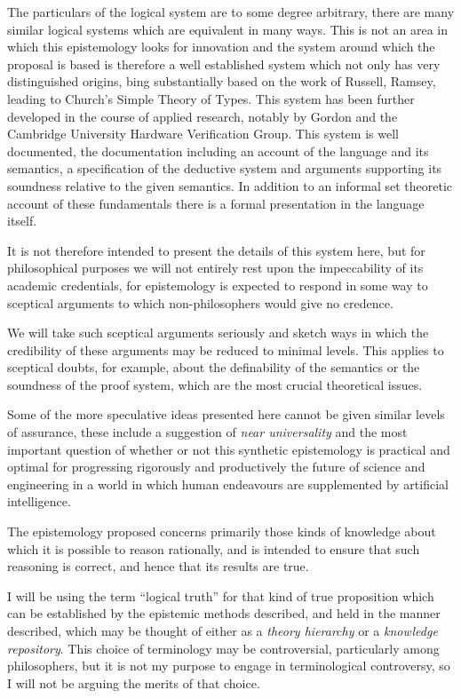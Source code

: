 \documentclass[10pt,titlepage]{book}
\begin{document}
The particulars of the logical system are to some degree arbitrary, there are many similar logical systems which are equivalent in many ways.
This is not an area in which this epistemology looks for innovation and the system around which the proposal is based is therefore a well established system which not only has very distinguished origins, bing substantially based on the work of Russell, Ramsey, leading to  Church's Simple Theory of Types.
This system has been further developed in the course of applied research, notably by Gordon and the Cambridge University Hardware Verification Group.
This system is well documented, the documentation including an account of the language and its semantics, a specification of the deductive system and arguments supporting its soundness relative to the given semantics.
In addition to an informal set theoretic account of these fundamentals there is a formal presentation in the language itself.

It is not therefore intended to present the details of this system here, but for philosophical purposes we will not entirely rest upon the impeccability of its academic credentials, for epistemology is expected to respond in some way to sceptical arguments to which non-philosophers would give no credence.

We will take such sceptical arguments seriously and sketch ways in which the credibility of these arguments may be reduced to minimal levels.
This applies to sceptical doubts, for example, about the definability of the semantics or the soundness of the proof system, which are the most crucial theoretical issues.

Some of the more speculative ideas presented here cannot be given similar levels of assurance, these include a suggestion of \emph{near universality} and the most important question of whether or not this synthetic epistemology is practical and optimal for progressing rigorously and productively the future of science and engineering in a world in which human endeavours are supplemented by artificial intelligence.

The epistemology proposed concerns primarily those kinds of knowledge about which it is possible to reason rationally, and is intended to ensure that such reasoning is correct, and hence that its results are true.

I will be using the term ``logical truth'' for that kind of true proposition which can be established by the epistemic methods described, and held in the manner described, which may be thought of either as a \emph{theory hierarchy} or a \emph{knowledge repository}.
This choice of terminology may be controversial, particularly among philosophers, but it is not my purpose to engage in terminological controversy, so I will not be arguing the merits of that choice.
\end{document}
